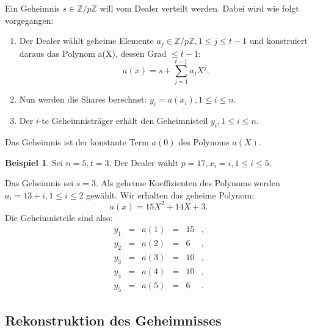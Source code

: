\documentclass[12pt, a4paper, oneside, titlepage]{report}
\newcommand{\Z}{\mathds{Z}}
\theoremstyle{definition}
\newtheorem{bsp}[lemma]{Beispiel}
\begin{document}
	Ein Geheimnis $ s \in \Z / p \Z $ will vom Dealer verteilt werden. Dabei wird wie folgt vorgegangen:
	
	\begin{enumerate}
		\item {
			Der Dealer wählt geheime Elemente $ a_j \in \Z / p \Z, 1 \leq j \leq t - 1 $ und konstruiert daraus das Polynom a(X), dessen Grad $ \leq t-1 $:
			\begin{equation}\label{secret-polynom-to-reconstruct}
			a(x) = s + \sum_{j=1}^{t-1} a_jX^j.
			\end{equation}
		}
		\item {
			Nun werden die Shares berechnet: $ y_i = a(x_i), 1 \leq i \leq n $.
		}
		\item {
			Der $ i $-te Geheimnisträger erhält den Geheimnisteil $ y_i, 1 \leq i \leq n $.
		}
	\end{enumerate}
	Das Geheimnis ist der konstante Term $ a(0) $ des Polynoms $ a(X) $.
	\begin{bsp}\label{shares-example}
		Sei $ n = 5, t = 3 $. Der Dealer wählt $ p = 17, x_i = i, 1 \leq i \leq 5 $.
		
		Das Geheimnis sei $ s = 3 $. Als geheime Koeffizienten des Polynoms werden $ a_i = 13 + i, 1 \leq i \leq 2 $ gewählt. Wir erhalten das geheime Polynom:
		$$ a(x) = 15 X^2 + 14X + 3. $$
		Die Geheimnisteile sind also:
		$$\begin{array}{cccccc}
			y_1 & = & a(1) & = & 15 & , \\
			y_2 & = & a(2) & = & 6 & , \\
			y_3 & = & a(3) & = & 10 & , \\
			y_4 & = & a(4) & = & 10 & , \\
			y_5 & = & a(5) & = & 6 & .
		\end{array}$$
	\end{bsp}
	
	\subsection{Rekonstruktion des Geheimnisses}
	
\end{document}
